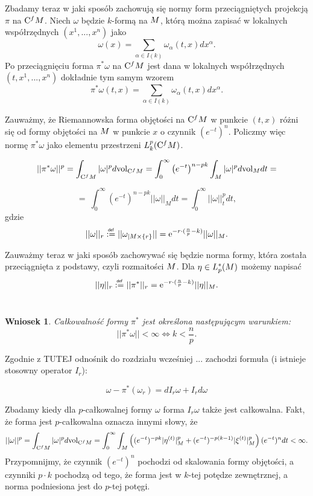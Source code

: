 \documentclass[licencjacka]{pracamgr}
\theoremstyle{definition}
\theoremstyle{definition}
\theoremstyle{plain}
\theoremstyle{plain}
\theoremstyle{plain}
\theoremstyle{plain}
\newtheorem{wniosek}{Wniosek}[section]
\def\cfm{\ensuremath\mathrm{C}^fM}
\def\M{\ensuremath M}
\newcommand\deff{\mathrel{\overset{\makebox[0pt]{\mbox{\normalfont\tiny\sffamily def}}}{:=}}}
\begin{document}
Zbadamy teraz w jaki sposób zachowują się normy form przeciągniętych 
projekcją $\pi$ na $\cfm$.
Niech $\omega$ będzie $k$-formą na $\M$, którą można zapisać w lokalnych
współrzędnych $(x^1, ..., x^n)$ jako
\[
\omega(x) = \sum_{\alpha \in I(k)} \omega_\alpha (t, x) dx^\alpha.
\]
Po przeciągnięciu forma $\pi^\ast \omega$ na $\cfm$ jest dana w lokalnych 
współrzędnych $(t, x^1, ..., x^n)$ dokładnie tym samym wzorem
\[
\pi^\ast \omega(t,x) = \sum_{\alpha \in I(k)} \omega_\alpha (t, x) dx^\alpha.
\]

Zauważmy, że Riemannowska forma objętości na $\cfm$ w punkcie $(t,x)$ różni się
od formy objętości na $\M$ w punkcie $x$ o czynnik $(e^{-t})^n$.
Policzmy więc
normę $\pi^\ast \omega$ jako elementu przestrzeni $L_k^p (\cfm)$.

\[
    ||\pi^\ast \omega ||^p = \int_{\cfm} |\omega |^p d \mathrm{vol}_{\cfm} =
    \int_0^\infty \left( e^{-t} \right)^{n-pk} \int_M |\omega|^p d
    \mathrm{vol}_M dt = 
\]

\[
    = \
    \int_0^\infty \left( e^{-t} \right)^{n-pk} || \omega ||_{M} dt = 
    \int_0^\infty || \omega ||_t^p dt,
\] 
gdzie
\[
|| \omega ||_r \deff || \omega_{|M \times \{r\} } || =
\mathrm{e}^{-r \cdot (\frac{n}{p} - k) }  ||\omega ||_{\M}.
\]

Zauważmy teraz w jaki sposób zachowywać się będzie norma formy, która
została przeciągnięta z podstawy, czyli rozmaitości $\M$. Dla 
$\eta \in L_p^\ast (\M)$ możemy napisać
\[
    || \eta ||_r \deff || \pi^\ast ||_r = 
\mathrm{e}^{-r \cdot (\frac{n}{p} - k) }  ||\eta ||_{\M}.
\] \\

\begin{wniosek}
  Całkowalność formy $\pi^\ast$ jest określona następującym warunkiem:
  \[
  ||\pi^\ast \omega ||  < \infty  \iff  k < \frac{n}{p}.
  \]
\end{wniosek}

Zgodnie z 
TUTEJ odnośnik do 
rozdziału wcześniej ... zachodzi formuła (i istnieje stosowny operator 
$I_r$):

\[
    \omega - \pi^\ast(\omega_r) = dI_r \omega + I_r d\omega
\]


Zbadamy kiedy dla $p$-całkowalnej formy $\omega$ forma $I_r \omega$
także jest całkowalna. Fakt, że forma jest  $p$-całkowalna oznacza innymi słowy, że
\[
    || \omega ||^p = \int_{\cfm} |\omega|^p d \text{vol}_{\cfm} =
    \int_0^\infty \int_{\M} \left(
        (e^{-t})^{-pk} | \eta^{(t)}|^p_{\M} + 
        (e^{-t})^{-p(k-1)} | \xi^{(t)}|^p_{\M} 
    \right)
    (e^{-t})^{n} dt < \infty.
\]
Przypomnijmy, że czynnik $ (e^{-t})^{n} $ pochodzi od skalowania formy objętości, a
czynniki $p \cdot k$ pochodzą od tego, że forma jest w $k$-tej potędze zewnętrznej,
a norma podniesiona jest do $p$-tej potęgi. \\
\end{document}
